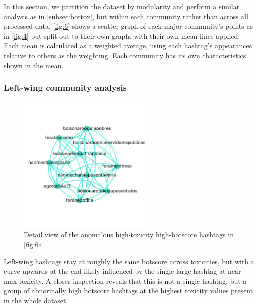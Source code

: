 \documentclass[a4paper,11pt]{article}  %
\begin{document}
	In this section, we partition the dataset by modularity and perform a similar analysis as in \autoref{subsec:bottox}, but within each community rather than across all processed data. \autoref{fig:6} shows a scatter graph of each major community's points as in \autoref{fig:4} but split out to their own graphs with their own mean lines applied. Each mean is calculated as a weighted average, using each hashtag's appearances relative to others as the weighting.
	Each community has its own characteristics shown in the mean.

	\subsubsection{Left-wing community analysis}
	
	\begin{figure}%
		\begin{center}
			\includegraphics[width=0.6\textwidth]{images/net_leftwing_hightox_highbot}
		\end{center}
		\caption{Detail view of the anomalous high-toxicity high-botscore hashtags in \autoref{fig:6a}.}
		\label{fig:7}
	\end{figure}

	Left-wing hashtags stay at roughly the same botscore across toxicities, but with a curve upwards at the end likely influenced by the single large hashtag at near-max toxicity. A closer inspection reveals that this is not a single hashtag, but a group of abnormally high botscore hashtags at the highest toxicity values present in the whole dataset. 
	
\end{document}
